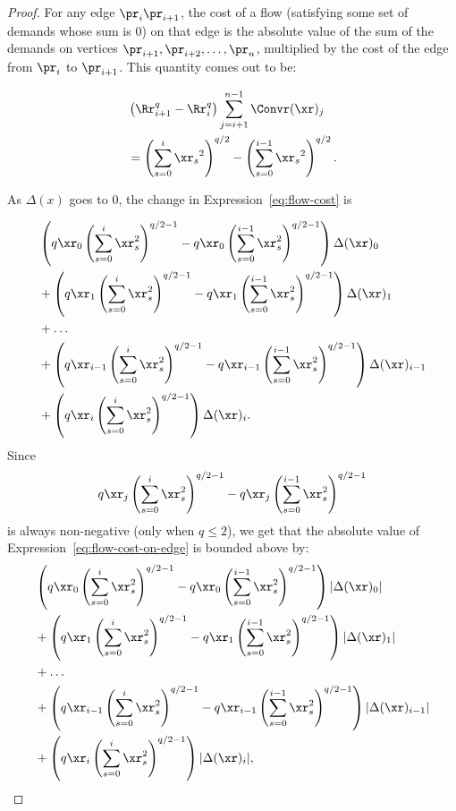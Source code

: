 \begin{proof} For any edge $\pr_i\pr_{i+1}$, the cost of a flow (satisfying
some set of demands whose sum is $0$) on that edge is the absolute value of
the sum of the demands on vertices $\pr_{i+1}, \pr_{i+2}, \ldots, \pr_n$,
multiplied by the cost of the edge from $\pr_i$ to $\pr_{i+1}$. This
quantity comes out to be:

\begin{align} &\left(\Rr_{i+1}^q-\Rr_{i}^q \right) \sum_{j=i+1}^{n-1} \Convr(\xr)_j
\\
\label{eq:flow-cost}
&=\left(\sum_{s=0}^{i} {\xr_s}^2\right)^{q/2} -\left(\sum_{s=0}^{i-1}
{\xr_s}^2\right)^{q/2}.
\end{align}

As $\Delta(x)$ goes to $0$, the change in Expression~\ref{eq:flow-cost} is

\begin{align}
\begin{split}
\label{eq:flow-cost-on-edge}
&
\left(q\xr_0 \left(\sum_{s=0}^{i} \xr_s^2 \right)^{q/2-1} -
q\xr_0\left(\sum_{s=0}^{i-1} \xr_s^2 \right)^{q/2-1} \right) \Delta(\xr)_0
\\
&+
\left(q\xr_1 \left(\sum_{s=0}^{i} \xr_s^2 \right)^{q/2-1} -
q\xr_1\left(\sum_{s=0}^{i-1}\xr_s^2 \right)^{q/2-1} \right) \Delta(\xr)_1
\\
&+ \ldots
\\
&+
\left(q\xr_{i-1} \left(\sum_{s=0}^{i} \xr_s^2 \right)^{q/2-1} -
q\xr_{i-1}\left(\sum_{s=0}^{i-1}\xr_s^2 \right)^{q/2-1}
\right)\Delta(\xr)_{i-1}
\\
&+
\left(q\xr_{i} \left(\sum_{s=0}^{i} \xr_s^2
\right)^{q/2-1}\right)\Delta(\xr)_{i}.
\end{split}
\end{align}
Since 
\[
q\xr_j\left(\sum_{s=0}^{i} \xr_s^2\right)^{q/2-1} - q\xr_j\left(\sum_{s=0}^{i-1}
\xr_s^2 \right)^{q/2-1}\]
is always non-negative (only when $q \leq 2$), we get that the absolute value of
Expression~\ref{eq:flow-cost-on-edge} is bounded above by:
\begin{align}
\begin{split}
\label{eq:flow-cost-upper-bound}
&
\left(q\xr_0 \left(\sum_{s=0}^{i} \xr_s^2 \right)^{q/2-1} -
q\xr_0\left(\sum_{s=0}^{i-1} \xr_s^2 \right)^{q/2-1} \right)
|\Delta(\xr)_0|
\\
&+
\left(q\xr_1 \left(\sum_{s=0}^{i} \xr_s^2 \right)^{q/2-1} -
q\xr_1\left(\sum_{s=0}^{i-1}\xr_s^2 \right)^{q/2-1} \right) |\Delta(\xr)_1|
\\
&+ \ldots
\\
&+
\left(q\xr_{i-1} \left(\sum_{s=0}^{i} \xr_s^2 \right)^{q/2-1} -
q\xr_{i-1}\left(\sum_{s=0}^{i-1}\xr_s^2 \right)^{q/2-1}
\right)|\Delta(\xr)_{i-1}|
\\
&+
\left(q\xr_{i} \left(\sum_{s=0}^{i} \xr_s^2
\right)^{q/2-1}\right)|\Delta(\xr)_{i}|,
\end{split}
\end{align}


\end{proof}
